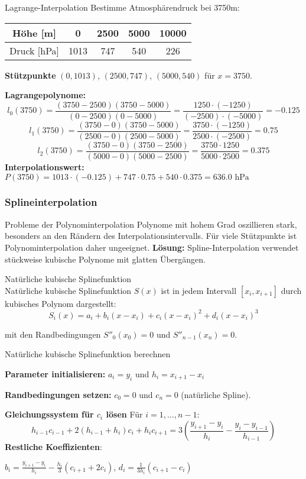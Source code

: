 \begin{example2}{Lagrange-Interpolation}
    Bestimme Atmosphärendruck bei 3750m:
\begin{center}
\begin{tabular}{|c|c|c|c|c|}
\hline
Höhe [m] & 0 & 2500 & 5000 & 10000 \\
\hline
Druck [hPa] & 1013 & 747 & 540 & 226 \\
\hline
\end{tabular}
\end{center}
\textbf{Stützpunkte} $(0, 1013)$, $(2500, 747)$, $(5000, 540)$ für $x = 3750$.

\textbf{Lagrangepolynome:}  
$$l_0(3750) = \frac{(3750-2500)(3750-5000)}{(0-2500)(0-5000)} = \frac{1250 \cdot (-1250)}{(-2500) \cdot (-5000)} = -0.125$$
$$l_1(3750) = \frac{(3750-0)(3750-5000)}{(2500-0)(2500-5000)} = \frac{3750 \cdot (-1250)}{2500 \cdot (-2500)} = 0.75$$
$$l_2(3750) = \frac{(3750-0)(3750-2500)}{(5000-0)(5000-2500)} = \frac{3750 \cdot 1250}{5000 \cdot 2500} = 0.375$$
\textbf{Interpolationswert:} \\
$P(3750) = 1013 \cdot (-0.125) + 747 \cdot 0.75 + 540 \cdot 0.375 = 636.0 \text{ hPa}$
\end{example2}

\raggedcolumns

\subsubsection{Splineinterpolation}

\begin{concept}{Probleme der Polynominterpolation} \small
Polynome mit hohem Grad oszillieren stark, besonders an den Rändern des Interpolationsintervalls. Für viele Stützpunkte ist Polynominterpolation daher ungeeignet.
\textbf{Lösung:} Spline-Interpolation verwendet stückweise kubische Polynome mit glatten Übergängen.
\end{concept}

\begin{definition}{Natürliche kubische Splinefunktion}\\
Natürliche kubische Splinefunktion $S(x)$ ist in jedem Intervall $[x_i, x_{i+1}]$ durch kubisches Polynom dargestellt:
$$S_i(x) = a_i + b_i(x - x_i) + c_i(x - x_i)^2 + d_i(x - x_i)^3$$

mit den Randbedingungen $S''_0(x_0) = 0$ und $S''_{n-1}(x_n) = 0$.
\end{definition}

\begin{KR}{Natürliche kubische Splinefunktion berechnen}

\textbf{Parameter initialisieren:}
$a_i = y_i$ und $h_i = x_{i+1} - x_i$

\textbf{Randbedingungen setzen:} $c_0 = 0$ und $c_n = 0$ (natürliche Spline).

\textbf{Gleichungssystem für $c_i$ lösen}
Für $i = 1, ..., n-1$:
$$h_{i-1} c_{i-1} + 2(h_{i-1} + h_i) c_i + h_i c_{i+1} = 3(\frac{y_{i+1} - y_i}{h_i} - \frac{y_i - y_{i-1}}{h_{i-1}})$$
\textbf{Restliche Koeffizienten}:

$b_i = \frac{y_{i+1} - y_i}{h_i} - \frac{h_i}{3}(c_{i+1} + 2c_i)$,
$d_i = \frac{1}{3h_i}(c_{i+1} - c_i)$
\end{KR}

